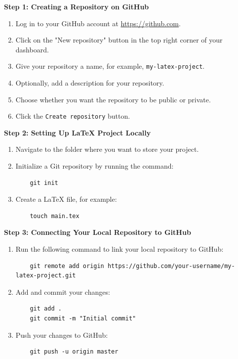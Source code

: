 \documentclass[a4paper,12pt]{article}
\begin{document}
\textbf{Step 1: Creating a Repository on GitHub}
\begin{enumerate}
    \item Log in to your GitHub account at \url{https://github.com}.
    \item Click on the "New repository" button in the top right corner of your dashboard.
    \item Give your repository a name, for example, \texttt{my-latex-project}.
    \item Optionally, add a description for your repository.
    \item Choose whether you want the repository to be public or private.
    \item Click the \texttt{Create repository} button.
\end{enumerate}

\textbf{Step 2: Setting Up LaTeX Project Locally}
\begin{enumerate}
    \item Navigate to the folder where you want to store your project.
    \item Initialize a Git repository by running the command:
    \begin{verbatim}
    git init
    \end{verbatim}
    \item Create a LaTeX file, for example:
    \begin{verbatim}
    touch main.tex
    \end{verbatim}
\end{enumerate}

\textbf{Step 3: Connecting Your Local Repository to GitHub}
\begin{enumerate}
    \item Run the following command to link your local repository to GitHub:
    \begin{verbatim}
    git remote add origin https://github.com/your-username/my-latex-project.git
    \end{verbatim}
    \item Add and commit your changes:
    \begin{verbatim}
    git add .
    git commit -m "Initial commit"
    \end{verbatim}
    \item Push your changes to GitHub:
    \begin{verbatim}
    git push -u origin master
    \end{verbatim}
\end{enumerate}
\end{document}
